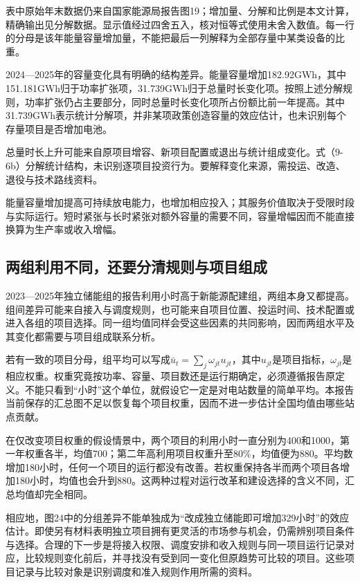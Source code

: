 \documentclass[UTF8,fontset=windows,12pt,a4paper,oneside,openany]{ctexbook}
\begin{document}
表中原始年末数据仍来自国家能源局报告图19；增加量、分解和比例是本文计算，精确输出见分解数据。显示值经过四舍五入，核对恒等式使用未舍入数值。每一行的分母是该年能量容量增加量，不能把最后一列解释为全部存量中某类设备的比重。

2024—2025年的容量变化具有明确的结构差异。能量容量增加182.92GWh，其中151.181GWh归于功率扩张项，31.739GWh归于总量时长变化项。按照上述分解规则，功率扩张仍占主要部分，同时总量时长变化项所占份额比前一年提高。其中31.739GWh表示统计分解项，并非某项政策创造容量的效应估计，也未识别每个存量项目是否增加电池。

总量时长上升可能来自原项目增容、新项目配置或退出与统计组成变化。式（9-6b）分解统计结构，未识别逐项目投资行为。要解释变化来源，需投运、改造、退役与技术路线资料。

能量容量增加提高可持续放电能力，也增加相应投入；其服务价值取决于受限时段与实际运行。短时紧张与长时紧张对额外容量的需要不同，容量增幅因而不能直接换算为生产率或收入增幅。

\subsection{两组利用不同，还要分清规则与项目组成}

2023—2025年独立储能组的报告利用小时高于新能源配建组，两组本身又都提高。组间差异可能来自接入与调度规则，也可能来自项目位置、投运时间、技术配置或进入各组的项目选择。同一组均值同样会受这些因素的共同影响，因而两组水平及其变化都需要与项目组成联系分析。

若有一致的项目分母，组平均可以写成\(\bar u_t=\sum_j\omega_{jt}u_{jt}\)，其中\(u_{jt}\)是项目指标，\(\omega_{jt}\)是相应权重。权重究竟按功率、容量、项目数还是运行期确定，必须遵循报告原定义。不能只看到“小时”这个单位，就假设它一定是对电站数量的简单平均。本报告当前保存的汇总图不足以恢复每个项目权重，因而不进一步估计全国均值由哪些站点贡献。

在仅改变项目权重的假设情景中，两个项目的利用小时一直分别为400和1000，第一年权重各半，均值700；第二年高利用项目权重升至80\%，均值便为880。平均数增加180小时，任何一个项目的运行都没有改善。若权重保持各半而两个项目各增加180小时，均值也会升到880。这两种过程对运行改革和建设选择的含义不同，汇总均值却完全相同。

相应地，图24中的分组差异不能单独成为“改成独立储能即可增加329小时”的效应估计。即使另有材料表明独立项目拥有更灵活的市场参与机会，仍需辨别项目条件与选择。合理的下一步是将接入权限、调度安排和收入规则与同一项目运行记录对应，比较规则变化前后，并寻找没有受到同一变化但原趋势可比较的项目。这些项目记录与比较对象是识别调度和准入规则作用所需的资料。
\end{document}
